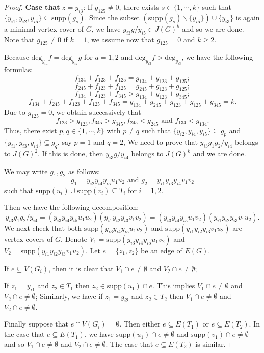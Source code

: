 \documentclass[12pt]{amsart}
\begin{document}
\begin{proof}
{\bf  Case that} $z=y_{i3}$:    If $g_{125}\neq0$, there exists $s \in \{1,\cdots, k\}$ such that $\{y_{i1},y_{i2},y_{i5}\}\subseteq \mathrm{supp}(g_s)$. Since the subset $(\mathrm{supp}(g_s)\backslash\{y_{i5}\})\cup\{y_{i3}\}$ is again a minimal vertex cover of $G$, we have $y_{i3}g/y_{i5} \in J(G)^k$ and so we are done. Note that  $g_{125}\neq 0$ if $k=1$, we  assume now that $g_{125}=0$ and $k\geq2$.

Because  $\mathrm{deg}_{y_{ia}}f=\mathrm{deg}_{y_{ia}}g$ for $a=1,2$  and $\mathrm{deg}_{y_{i3}}f>\mathrm{deg}_{y_{i3}}$,  we have the following formulas:$$f_{134}+f_{123}+f_{125}=g_{134}+g_{123}+g_{125};$$ $$f_{245}+f_{123}+f_{125}=g_{245}+g_{123}+g_{125};$$ $$f_{134}+f_{123}+f_{345}>g_{134}+g_{123}+g_{345};$$ $$f_{134}+f_{245}+f_{123}+f_{125}+f_{345}=g_{134}+g_{245}+g_{123}+g_{125}+g_{345}=k.$$
Due to $g_{125}=0$,  we obtain successively that $$f_{123}>g_{123}, f_{345}>g_{345}, f_{245}<g_{245} \mbox{ and } f_{134}<g_{134}.$$  Thus, there exist $p,q\in \{1,\cdots, k\}$ with $p\neq q$ such that $\{y_{i2},y_{i4},y_{i5}\}\subseteq g_p$ and  $\{y_{i1},y_{i3},y_{i4}\}\subseteq g_q$.  say $p=1$ and $q=2$, We need to prove that $y_{i3}g_1g_2/y_{i4}$ belongs to $J(G)^2$. If this is done, then $y_{i3}g/y_{i4}$ belongs to  $J(G)^k$ and we are done.

 We  may write $g_1, g_2$ as follows: $$g_1=y_{i2}y_{i4}y_{i5}u_1u_2 \mbox{ and }  g_2=y_{i1}y_{i3}y_{i4}v_1v_2$$  such that  $\mathrm{supp}(u_i)\cup \mathrm{supp}(v_i)\subseteq T_i$  for $i=1,2$.

Then we have the following decomposition: $$y_{i3}g_1g_2/y_{i4}=(y_{i3}y_{i4}y_{i5}u_1u_2)(y_{i1}y_{i2}y_{i3}v_1v_2)=(y_{i3}y_{i4}y_{i5}u_1v_2)(y_{i1}y_{i2}y_{i3}v_1u_2).$$  We next check  that both $\mathrm{supp}(y_{i3}y_{i4}y_{i5}u_1v_2)$ and $\mathrm{supp}(y_{i1}y_{i2}y_{i3}v_1u_2)$ are vertex covers of $G$. Denote $V_1=\mathrm{supp}(y_{i3}y_{i4}y_{i5}u_1v_2)$ and $V_2=\mathrm{supp}(y_{i1}y_{i2}y_{i3}v_1u_2)$. Let $e=\{z_1,z_2\}$ be an edge of $E(G)$.

  If $e\subseteq V(G_i)$, then it is clear that $V_1\cap e\neq \emptyset$ and $V_2\cap e\neq \emptyset$;

  If $z_1=y_{i1}$ and $z_2\in T_1$ then $z_2\in \mathrm{supp}(u_1)\cap e$. This  implies $V_1\cap e\neq \emptyset$ and $V_2\cap e\neq \emptyset$; Similarly, we have if $z_1=y_{i2}$ and  $z_2\in T_2$ then $V_1\cap e\neq \emptyset$ and $V_2\cap e\neq \emptyset$.


 Finally  suppose that $e\cap V(G_i)=\emptyset$. Then either $e\subseteq  E(T_1)$ or $e\subseteq E(T_2)$. In the case that $e\subseteq  E(T_1)$, we have $\mathrm{supp}{(u_1)}\cap e\neq \emptyset$ and $\mathrm{supp}{(v_1)}\cap e\neq \emptyset$  and so  $V_1\cap e\neq \emptyset$ and $V_2\cap e\neq \emptyset$. The case that $e\subseteq  E(T_2)$ is similar.


\end{proof}
\end{document}
